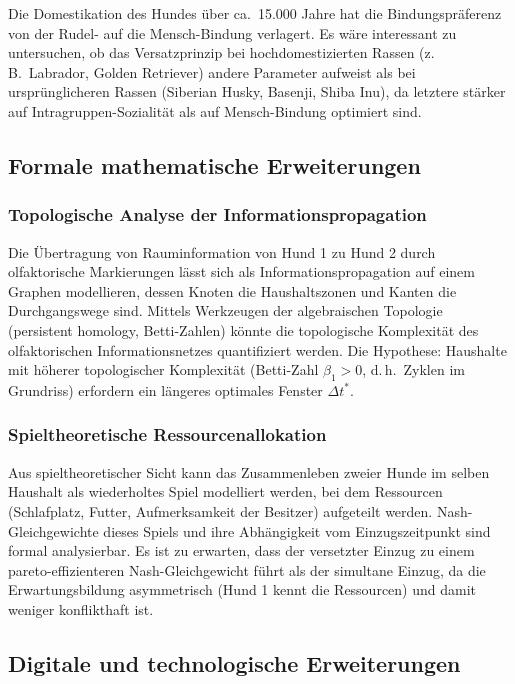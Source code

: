 ﻿\documentclass[12pt, a4paper]{article}
\theoremstyle{plain}
\theoremstyle{definition}
\theoremstyle{remark}
\newcommand{\dt}{\Delta t}
\begin{document}
Die Domestikation des Hundes über ca.\ 15.000 Jahre \cite{vonholdt2010genome}
hat die Bindungspräferenz von der Rudel- auf die Mensch-Bindung verlagert.
Es wäre interessant zu untersuchen, ob das Versatzprinzip bei hochdomestizierten
Rassen (z.\,B.\ Labrador, Golden Retriever) andere Parameter aufweist als
bei ursprünglicheren Rassen (Siberian Husky, Basenji, Shiba Inu), da
letztere stärker auf Intragruppen-Sozialität als auf Mensch-Bindung
optimiert sind.

\subsection{Formale mathematische Erweiterungen}

\subsubsection{Topologische Analyse der Informationspropagation}

Die Übertragung von Rauminformation von Hund 1 zu Hund 2 durch olfaktorische
Markierungen lässt sich als Informationspropagation auf einem Graphen
modellieren, dessen Knoten die Haushaltszonen und Kanten die Durchgangswege
sind. Mittels Werkzeugen der algebraischen Topologie (persistent homology,
Betti-Zahlen) könnte die topologische Komplexität des olfaktorischen
Informationsnetzes quantifiziert werden. Die Hypothese: Haushalte mit
höherer topologischer Komplexität (Betti-Zahl $\beta_1 > 0$, d.\,h.\ Zyklen
im Grundriss) erfordern ein längeres optimales Fenster $\dt^*$.

\subsubsection{Spieltheoretische Ressourcenallokation}

Aus spieltheoretischer Sicht kann das Zusammenleben zweier Hunde im selben
Haushalt als wiederholtes Spiel modelliert werden, bei dem Ressourcen
(Schlafplatz, Futter, Aufmerksamkeit der Besitzer) aufgeteilt werden.
Nash-Gleichgewichte dieses Spiels und ihre Abhängigkeit vom Einzugszeitpunkt
sind formal analysierbar. Es ist zu erwarten, dass der versetzter Einzug
zu einem pareto-effizienteren Nash-Gleichgewicht führt als der simultane
Einzug, da die Erwartungsbildung asymmetrisch (Hund 1 kennt die Ressourcen)
und damit weniger konflikthaft ist.

\subsection{Digitale und technologische Erweiterungen}
\end{document}

